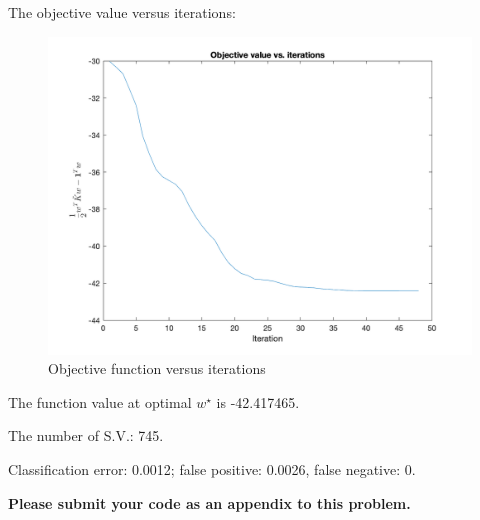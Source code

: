 \documentclass{article}
\theoremstyle{remark}
\theoremstyle{definition}
\begin{document}
\begin{enumerate}[(a)]
\begin{enumerate}[(i)]
{      The objective value versus iterations:
      \begin{figure}
          \centering
          \includegraphics[scale=.4]{obj_barrier.png}
          \caption{Objective function versus iterations}
          \label{fig:my_label}
      \end{figure}
      
      The function value at optimal $w^\star$ is -42.417465.
      
      The number of S.V.: 745.
      
      Classification error: 0.0012; false positive: 0.0026, false negative: 0.
      }
  \end{enumerate}

\end{enumerate}

\textbf{Please submit your code as an appendix to this problem.}
\end{document}
